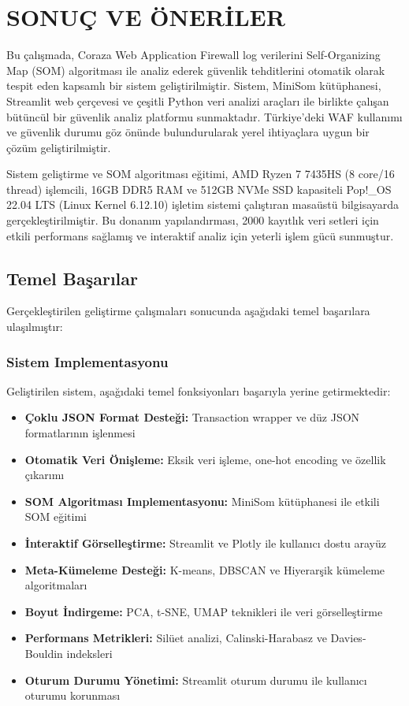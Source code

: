 \section{SONUÇ VE ÖNERİLER}

Bu çalışmada, Coraza Web Application Firewall log verilerini Self-Organizing Map (SOM) algoritması ile analiz ederek güvenlik tehditlerini otomatik olarak tespit eden kapsamlı bir sistem geliştirilmiştir. Sistem, MiniSom kütüphanesi, Streamlit web çerçevesi ve çeşitli Python veri analizi araçları ile birlikte çalışan bütüncül bir güvenlik analiz platformu sunmaktadır. Türkiye'deki WAF kullanımı ve güvenlik durumu \cite{koc2022waf_turkiye,tbd_rapor2022} göz önünde bulundurularak yerel ihtiyaçlara uygun bir çözüm geliştirilmiştir.

Sistem geliştirme ve SOM algoritması eğitimi, AMD Ryzen 7 7435HS (8 core/16 thread) işlemcili, 16GB DDR5 RAM ve 512GB NVMe SSD kapasiteli Pop!\_OS 22.04 LTS (Linux Kernel 6.12.10) işletim sistemi çalıştıran masaüstü bilgisayarda gerçekleştirilmiştir. Bu donanım yapılandırması, 2000 kayıtlık veri setleri için etkili performans sağlamış ve interaktif analiz için yeterli işlem gücü sunmuştur.

\subsection{Temel Başarılar}

Gerçekleştirilen geliştirme çalışmaları sonucunda aşağıdaki temel başarılara ulaşılmıştır:

\subsubsection{Sistem Implementasyonu}

Geliştirilen sistem, aşağıdaki temel fonksiyonları başarıyla yerine getirmektedir:

\begin{itemize}
    \item \textbf{Çoklu JSON Format Desteği:} Transaction wrapper ve düz JSON formatlarının işlenmesi
    \item \textbf{Otomatik Veri Önişleme:} Eksik veri işleme, one-hot encoding ve özellik çıkarımı
    \item \textbf{SOM Algoritması Implementasyonu:} MiniSom kütüphanesi ile etkili SOM eğitimi
    \item \textbf{İnteraktif Görselleştirme:} Streamlit ve Plotly ile kullanıcı dostu arayüz
    \item \textbf{Meta-Kümeleme Desteği:} K-means, DBSCAN ve Hiyerarşik kümeleme algoritmaları
    \item \textbf{Boyut İndirgeme:} PCA, t-SNE, UMAP teknikleri ile veri görselleştirme
    \item \textbf{Performans Metrikleri:} Silüet analizi, Calinski-Harabasz ve Davies-Bouldin indeksleri
    \item \textbf{Oturum Durumu Yönetimi:} Streamlit oturum durumu ile kullanıcı oturumu korunması
\end{itemize}

